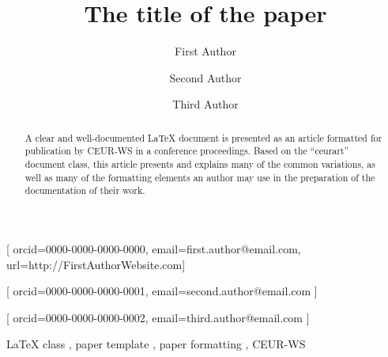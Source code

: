 \documentclass[
]{ceurart}
\begin{document}


\title{The title of the paper}

\author[1,2]{First Author}[%
orcid=0000-0000-0000-0000,
email=first.author@email.com,
url=http://FirstAuthorWebsite.com]
\address[1]{First affiliation,
  Address, City, Zip code, Country}
\address[2]{Some other affiliation,
  Address, City, Zip code, Country}

\author[1]{Second Author}[%
orcid=0000-0000-0000-0001,
email=second.author@email.com
]

\author[1]{Third Author}[%
orcid=0000-0000-0000-0002,
email=third.author@email.com
]

\begin{abstract}
  A clear and well-documented \LaTeX{} document is presented as an
  article formatted for publication by CEUR-WS in a conference
  proceedings. Based on the ``ceurart'' document class, this article
  presents and explains many of the common variations, as well as many
  of the formatting elements an author may use in the preparation of
  the documentation of their work.
\end{abstract}

\begin{keywords}
  \LaTeX{} class \sep
  paper template \sep
  paper formatting \sep
  CEUR-WS
\end{keywords}

\maketitle
\end{document}
